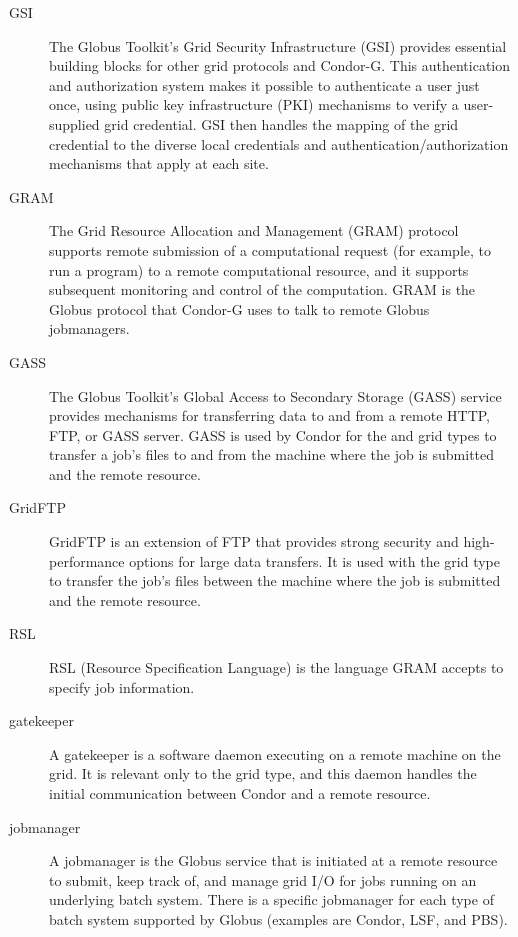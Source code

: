 \begin{description}
\item[GSI]
The Globus Toolkit's Grid Security Infrastructure (GSI) provides essential
building blocks for other grid protocols and Condor-G.
This authentication and authorization system
makes it possible to authenticate a user just once,
using public key infrastructure (PKI) mechanisms to verify
a user-supplied grid credential.
GSI then handles the mapping of the grid credential to the
diverse local credentials and authentication/authorization mechanisms that
apply at each site. 
\item[GRAM]
The Grid Resource Allocation and Management (GRAM) protocol supports remote
submission of a computational request (for example, to run a program)
to a remote computational resource,
and it supports subsequent monitoring and control of the computation. 
GRAM is the Globus protocol that Condor-G uses to talk to remote Globus
  jobmanagers.
\item[GASS]
The Globus Toolkit's Global Access to Secondary Storage (GASS) service provides
mechanisms for transferring data to and from a remote HTTP, FTP, or GASS server. 
GASS is used by Condor for the 
 and  grid types
to transfer a job's files
to and from the machine where the job is submitted and the remote resource.
\item[GridFTP]
GridFTP is an extension of FTP that provides strong security and 
high-performance options for large data transfers.
It is used with the  grid type
to transfer the job's files between the machine where the job
is submitted and the remote resource.
\item[RSL]
RSL (Resource Specification Language)  is the language GRAM 
accepts to specify job information.
\item[gatekeeper]
A gatekeeper is a software daemon executing on a remote machine on
the grid.
It is relevant only to the  grid type,
and this daemon handles the initial communication between
Condor and a remote resource.
\item[jobmanager]
A jobmanager is
the Globus service that is initiated at a remote resource to submit,
keep track of, and manage grid I/O for jobs running on 
an underlying batch system.
There is a specific jobmanager for each type of
batch system supported by Globus (examples are Condor, LSF, and PBS).

\end{description}


